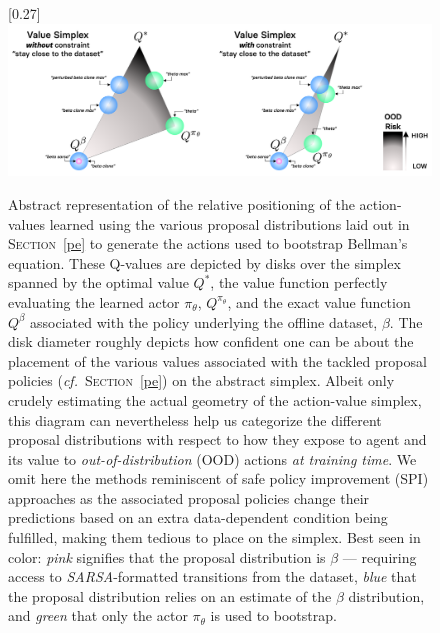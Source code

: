 \begin{figure}[!h]
  \center\scalebox{0.27}[0.27]{\includegraphics{Diags/value_simplex.pdf}}
  \caption{Abstract representation of the relative positioning of the action-values learned
  using the various proposal distributions laid out in \textsc{Section}~\ref{pe}
  to generate the actions used to bootstrap Bellman's equation.
  These Q-values are depicted by disks over the simplex spanned by the optimal value $Q^*$, the value function
  perfectly evaluating the learned actor $\pi_\theta$, $Q^{\pi_\theta}$, and the exact value function $Q^\beta$
  associated with the policy underlying the offline dataset, $\beta$.
  The disk diameter roughly depicts how confident one can be about the placement of the various
  values associated with the tackled proposal policies (\textit{cf.}~\textsc{Section}~\ref{pe}) on the abstract simplex.
  Albeit only crudely estimating the actual geometry of the action-value simplex,
  this diagram can nevertheless help us categorize the
  different proposal distributions with respect to how they expose to agent and its value to
  \emph{out-of-distribution} (OOD) actions \emph{at training time}.
  We omit here the methods reminiscent of safe policy improvement (SPI) approaches as the associated proposal
  policies change their predictions based on an extra data-dependent condition being fulfilled,
  making them tedious to place on the simplex.
  Best seen in color:
  \textit{pink} signifies that the proposal distribution is $\beta$ --- requiring access to
  \textit{SARSA}-formatted transitions from the dataset, \textit{blue} that the proposal distribution relies on an
  estimate of the $\beta$ distribution, and \textit{green} that only the actor $\pi_\theta$ is used
  to bootstrap.}
  \label{valuesimplex}
\end{figure}

